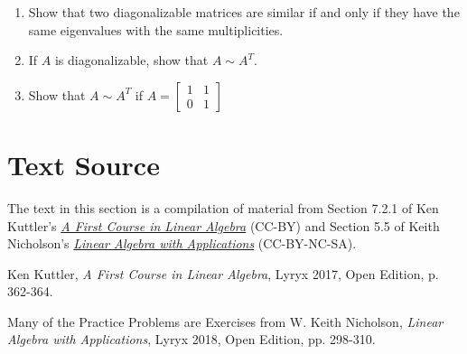 \documentclass{ximera}
\begin{document}
\begin{problem}\label{prb:A_sim_A^T_diagonalizable}
\begin{enumerate}

\item Show that two diagonalizable matrices are similar if and only if they have the same eigenvalues with the same multiplicities.

\item If $A$ is diagonalizable, show that $A \sim A^{T}$.

\item Show that $A \sim A^{T}$ if
 $A = \begin{bmatrix}
 1 & 1 \\
 0 & 1
 \end{bmatrix}$

\end{enumerate}
\end{problem}

\section*{Text Source}
The text in this section is a compilation of material from Section 7.2.1 of Ken Kuttler's \href{https://open.umn.edu/opentextbooks/textbooks/a-first-course-in-linear-algebra-2017}{\it A First Course in Linear Algebra} (CC-BY) and Section 5.5 of Keith Nicholson's \href{https://open.umn.edu/opentextbooks/textbooks/linear-algebra-with-applications}{\it Linear Algebra with Applications} (CC-BY-NC-SA).

Ken Kuttler, {\it  A First Course in Linear Algebra}, Lyryx 2017, Open Edition, p. 362-364.

Many of the Practice Problems are Exercises from 
W. Keith Nicholson, {\it Linear Algebra with Applications}, Lyryx 2018, Open Edition, pp. 298-310.
\end{document}
